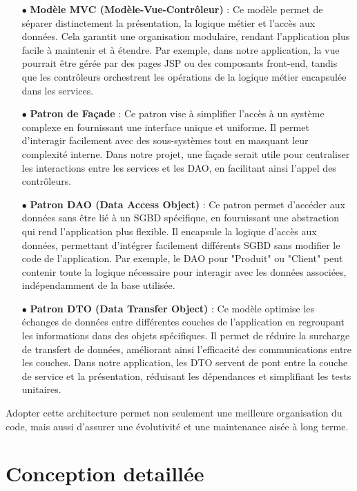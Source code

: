 \begin{itemize}
    \item[$\bullet$] \textbf{Modèle MVC (Modèle-Vue-Contrôleur)} : Ce modèle permet de séparer distinctement la présentation, la logique métier et l'accès aux données. Cela garantit une organisation modulaire, rendant l'application plus facile à maintenir et à étendre. Par exemple, dans notre application, la vue pourrait être gérée par des pages JSP ou des composants front-end, tandis que les contrôleurs orchestrent les opérations de la logique métier encapsulée dans les services.

    \item[$\bullet$] \textbf{Patron de Façade} : Ce patron vise à simplifier l'accès à un système complexe en fournissant une interface unique et uniforme. Il permet d'interagir facilement avec des sous-systèmes tout en masquant leur complexité interne. Dans notre projet, une façade serait utile pour centraliser les interactions entre les services et les DAO, en facilitant ainsi l'appel des contrôleurs.

    \item[$\bullet$] \textbf{Patron DAO (Data Access Object)} : Ce patron permet d'accéder aux données sans être lié à un SGBD spécifique, en fournissant une abstraction qui rend l'application plus flexible. Il encapsule la logique d'accès aux données, permettant d'intégrer facilement différents SGBD sans modifier le code de l'application. Par exemple, le DAO pour "Produit" ou "Client" peut contenir toute la logique nécessaire pour interagir avec les données associées, indépendamment de la base utilisée.

    \item[$\bullet$] \textbf{Patron DTO (Data Transfer Object)} : Ce modèle optimise les échanges de données entre différentes couches de l'application en regroupant les informations dans des objets spécifiques. Il permet de réduire la surcharge de transfert de données, améliorant ainsi l'efficacité des communications entre les couches. Dans notre application, les DTO servent de pont entre la couche de service et la présentation, réduisant les dépendances et simplifiant les tests unitaires.
\end{itemize}

Adopter cette architecture permet non seulement une meilleure organisation du code, mais aussi d'assurer une évolutivité et une maintenance aisée à long terme.
\section{Conception detaillée}

